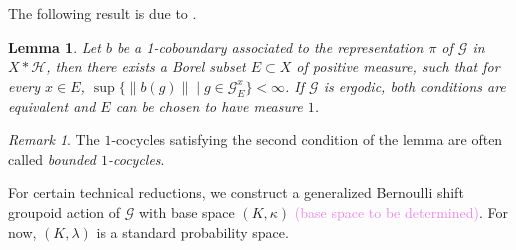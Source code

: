 \documentclass[a4paper,11pt]{article}
\numberwithin{equation}{section}
\newtheorem{lem}[thm]{Lemma}
\theoremstyle{definition}
\theoremstyle{remark}
\newtheorem{rem}[thm]{Remark}
\numberwithin{equation}{section}
\newcommand{\rG}{\mathcal{G}}
\def\H{\mathcal H}
\providecommand{\norm}[1]{\lVert#1\rVert}
\numberwithin{equation}{section}
\begin{document}
The following result is due to \textcite[Theorem 3.19, Lemma 3.20]{anatharaman:05}.

\begin{lem}\label{bound}
Let $b$ be a 1-coboundary associated to the representation $\pi$ of $\rG$ in $X\ast \H$, then there exists a Borel subset $E\subset X$ of positive measure, such that for every $x\in E$, $\sup\{\norm{b(g)}\mid g\in \rG_E^x\}<\infty$. If $\rG$ is ergodic, both conditions are equivalent and $E$ can be chosen to have measure $1$.
\end{lem}

\begin{rem}
    The $1$-cocycles satisfying the second condition of the lemma are often called {\it bounded $1$-cocycles}.
\end{rem}


For certain technical reductions, we construct a generalized Bernoulli shift groupoid action of $ \rG $ with base space $ (K,\kappa) $ \textcolor{violet}{(base space to be determined)}. For now, $ (K,\lambda) $ is a standard probability space.
\end{document}
